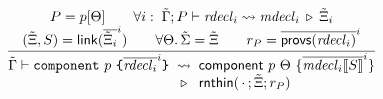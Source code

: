 \begin{figure}


\fbox{$\shctx \vdash \Scomp \leadsto \Uunit \haspr \lctx$}

\[
\frac{
\begin{array}{c}
  P = p[\reqs] \qquad
  \forall i:\; \shctx; P \vdash \Sdecl_i \leadsto \Uudecl_i \haspr \lctx_i \\
  (\lctx, S) = \Flink{\overlinei{\lctx_i}} \qquad
  \lctxpair{\provs}{\reqs} = \lctx \qquad
  r_P = \overlinei{\Fprovs{\Sdecl_i}} \\
\end{array}
}{
\begin{array}{@{}r@{\;\;}c@{\;\;}l@{}}
  \shctx \vdash \Scomponent{p}{\overlinei{\Sdecl_i}}
    &\leadsto& \UsynUnit{p}{\reqs}{\overlinei{\substw{\Uudecl_i}{S}}}
  \\
    &\haspr& \Frename{\,\cdot\,}{\lctx}{r_P}
\end{array}
}
\]
\\




\end{figure}
